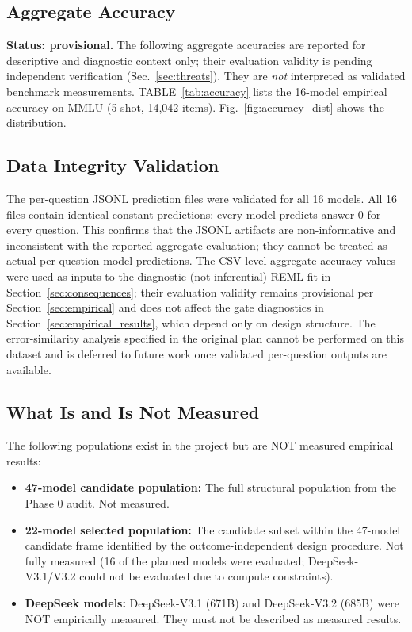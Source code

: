 \documentclass[11pt]{article}
\theoremstyle{definition}
\theoremstyle{plain}
\begin{document}
 \subsection{Aggregate Accuracy}
\textbf{Status: provisional.} The following aggregate accuracies are reported for descriptive and diagnostic context only; their evaluation validity is pending independent verification (Sec.~\ref{sec:threats}). They are \emph{not} interpreted as validated benchmark measurements.
TABLE~\ref{tab:accuracy} lists the 16-model empirical accuracy on MMLU (5-shot, 14,042 items). Fig.~\ref{fig:accuracy_dist} shows the distribution.

\subsection{Data Integrity Validation}
The per-question JSONL prediction files were validated for all 16 models. All 16 files contain identical constant predictions: every model predicts answer 0 for every question. This confirms that the JSONL artifacts are non-informative and inconsistent with the reported aggregate evaluation; they cannot be treated as actual per-question model predictions. The CSV-level aggregate accuracy values were used as inputs to the diagnostic (not inferential) REML fit in Section~\ref{sec:consequences}; their evaluation validity remains provisional per Section~\ref{sec:empirical} and does not affect the gate diagnostics in Section~\ref{sec:empirical_results}, which depend only on design structure. The error-similarity analysis specified in the original plan cannot be performed on this dataset and is deferred to future work once validated per-question outputs are available.

\subsection{What Is and Is Not Measured}
The following populations exist in the project but are NOT measured empirical results:
\begin{itemize}
\item \textbf{47-model candidate population:} The full structural population from the Phase 0 audit. Not measured.
\item \textbf{22-model selected population:} The candidate subset within the 47-model candidate frame identified by the outcome-independent design procedure. Not fully measured (16 of the planned models were evaluated; DeepSeek-V3.1/V3.2 could not be evaluated due to compute constraints).
\item \textbf{DeepSeek models:} DeepSeek-V3.1 \mbox{(671B)} and DeepSeek-V3.2 \mbox{(685B)} were NOT empirically measured. They must not be described as measured results.
\end{itemize}
\end{document}
